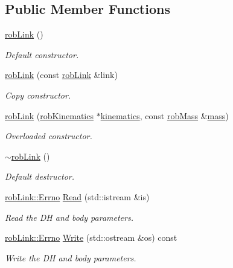 \subsection*{Public Member Functions}
\begin{DoxyCompactItemize}
\item 
\hyperlink{classrob_link_a5c9bf326ac6a5cdbb3d81298542d8b2a}{rob\+Link} ()
\begin{DoxyCompactList}\small\item\em Default constructor. \end{DoxyCompactList}\item 
\hyperlink{classrob_link_af121e250141aed290d0032ca9ede0b97}{rob\+Link} (const \hyperlink{classrob_link}{rob\+Link} \&link)
\begin{DoxyCompactList}\small\item\em Copy constructor. \end{DoxyCompactList}\item 
\hyperlink{classrob_link_a7ab7ea35f349edacca6168040b2bd5a9}{rob\+Link} (\hyperlink{classrob_kinematics}{rob\+Kinematics} $\ast$\hyperlink{classrob_link_a4aa26f90307b406c336f9b7fae00b905}{kinematics}, const \hyperlink{classrob_mass}{rob\+Mass} \&\hyperlink{classrob_link_a7b524ebf9d101bc369749585db1ba66d}{mass})
\begin{DoxyCompactList}\small\item\em Overloaded constructor. \end{DoxyCompactList}\item 
\hyperlink{classrob_link_accaf7612af8696ae8188013b4acfcd9a}{$\sim$rob\+Link} ()
\begin{DoxyCompactList}\small\item\em Default destructor. \end{DoxyCompactList}\item 
\hyperlink{classrob_link_aeafaa7aaa6cb47af0db3b746606c0bd0}{rob\+Link\+::\+Errno} \hyperlink{classrob_link_a9b3945e5c8efca7c331a6d9f560ec4ff}{Read} (std\+::istream \&is)
\begin{DoxyCompactList}\small\item\em Read the D\+H and body parameters. \end{DoxyCompactList}\item 
\hyperlink{classrob_link_aeafaa7aaa6cb47af0db3b746606c0bd0}{rob\+Link\+::\+Errno} \hyperlink{classrob_link_afb16c58fe303d6aaeab579b86f65c00b}{Write} (std\+::ostream \&os) const 
\begin{DoxyCompactList}\small\item\em Write the D\+H and body parameters. \end{DoxyCompactList}\item 

\end{DoxyCompactItemize}
